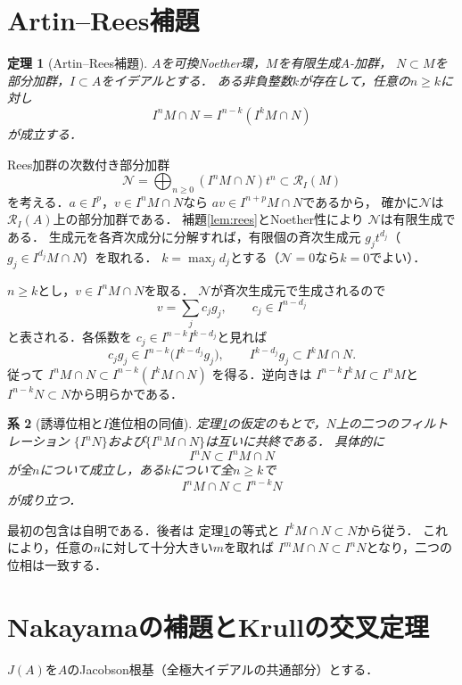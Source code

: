\documentclass[a5paper,10pt,onecolumn]{jsarticle}
\makeatletter
\theoremstyle{mathnotetheorem}
\newtheorem{theorem}{定理}[section]
\newtheorem{corollary}[theorem]{系}
\renewcommand{\proofname}{証明}
\renewenvironment{proof}[1][\proofname]{%
  \par\pushQED{\qed}\normalfont\topsep4\p@\@plus2\p@\relax
  \trivlist\item[\hskip\labelsep\bfseries #1]\ignorespaces
}{\popQED\endtrivlist\@endpefalse}
\makeatother
\begin{document}
\section{Artin--Rees補題}
\begin{theorem}[Artin--Rees補題]\label{thm:AR}
$A$を可換Noether環，$M$を有限生成$A$-加群，
$N\subset M$を部分加群，$I\subset A$をイデアルとする．
ある非負整数$k$が存在して，任意の$n\ge k$に対し
\[
 I^nM\cap N=I^{n-k}(I^kM\cap N)
\]
が成立する．
\end{theorem}
\begin{proof}
Rees加群の次数付き部分加群
\[
 \mathcal N=\bigoplus_{n\ge0}(I^nM\cap N)t^n
 \subset\mathcal R_I(M)
\]
を考える．$a\in I^p$，$v\in I^nM\cap N$なら
$av\in I^{n+p}M\cap N$であるから，
確かに$\mathcal N$は$\mathcal R_I(A)$上の部分加群である．
補題\ref{lem:rees}とNoether性により
$\mathcal N$は有限生成である．
生成元を各斉次成分に分解すれば，有限個の斉次生成元
$g_jt^{d_j}$（$g_j\in I^{d_j}M\cap N$）を取れる．
$k=\max_jd_j$とする（$\mathcal N=0$なら$k=0$でよい）．

$n\ge k$とし，$v\in I^nM\cap N$を取る．
$\mathcal N$が斉次生成元で生成されるので
\[
 v=\sum_j c_jg_j,\qquad c_j\in I^{n-d_j}
\]
と表される．各係数を
$c_j\in I^{n-k}I^{k-d_j}$と見れば
\[
 c_jg_j\in I^{n-k}\bigl(I^{k-d_j}g_j\bigr),\qquad
 I^{k-d_j}g_j\subset I^kM\cap N.
\]
従って
$ I^nM\cap N\subset I^{n-k}(I^kM\cap N)$
を得る．逆向きは
$ I^{n-k}I^kM\subset I^nM$と
$ I^{n-k}N\subset N$から明らかである．
\end{proof}

\begin{corollary}[誘導位相と$I$進位相の同値]\label{cor:topology}
定理\ref{thm:AR}の仮定のもとで，$N$上の二つのフィルトレーション
$\{I^nN\}$および$\{I^nM\cap N\}$は互いに共終である．
具体的に
\[
 I^nN\subset I^nM\cap N
\]
が全$n$について成立し，ある$k$について全$n\ge k$で
\[
 I^nM\cap N\subset I^{n-k}N
\]
が成り立つ．
\end{corollary}
\begin{proof}
最初の包含は自明である．後者は
定理\ref{thm:AR}の等式と
$I^kM\cap N\subset N$から従う．
これにより，任意の$n$に対して十分大きい$m$を取れば
$I^mM\cap N\subset I^nN$となり，二つの位相は一致する．
\end{proof}

\section{Nakayamaの補題とKrullの交叉定理}
$J(A)$を$A$のJacobson根基（全極大イデアルの共通部分）とする．
\end{document}
